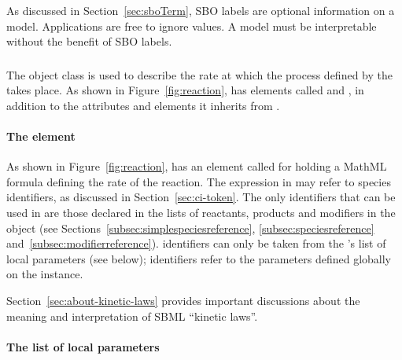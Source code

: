 As discussed in Section~\ref{sec:sboTerm}, SBO labels are optional
information on a model.  Applications are free to ignore
 values.  A model must be interpretable without the
benefit of SBO labels.

\subsubsection{}
\label{subsec:kinetic-law}
\label{subsec:listoflocalparameters}

The \KineticLaw object class is used to describe the rate at which
the process defined by the \Reaction takes place.  As shown in
Figure~\vref{fig:reaction}, \KineticLaw has elements called
 and , in addition to the
attributes and elements it inherits from \SBase.

\paragraph{The  element}

As shown in Figure~\vref{fig:reaction}, \KineticLaw 
has an element called  for holding a MathML formula
defining the rate of the reaction.  The expression in 
may refer to species identifiers, as discussed in
Section~\ref{sec:ci-token}.  The only \Species identifiers that
can be used in  are those declared in the lists of
reactants, products and modifiers in the \Reaction object (see
Sections~\ref{subsec:simplespeciesreference},
\ref{subsec:speciesreference} and~\ref{subsec:modifierreference}).
\LocalParameter identifiers can only be taken from the \KineticLaw's list of
local parameters (see below); \Parameter identifiers refer to the parameters defined globally on
the \Model instance.

Section~\ref{sec:about-kinetic-laws} provides important
discussions about the meaning and interpretation of SBML ``kinetic
laws''.


\paragraph{The list of local parameters}

